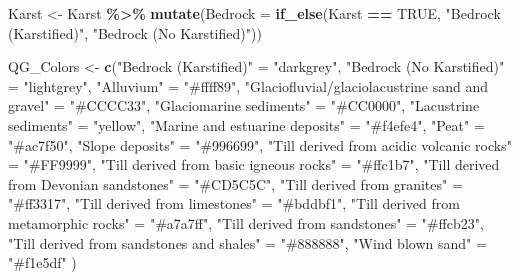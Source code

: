 \documentclass[
  12pt,
]{article}
\newenvironment{Shaded}{\begin{snugshade}}{\end{snugshade}}
\newcommand{\DataTypeTok}[1]{\textcolor[rgb]{0.13,0.29,0.53}{#1}}
\newcommand{\KeywordTok}[1]{\textcolor[rgb]{0.13,0.29,0.53}{\textbf{#1}}}
\newcommand{\NormalTok}[1]{#1}
\newcommand{\OperatorTok}[1]{\textcolor[rgb]{0.81,0.36,0.00}{\textbf{#1}}}
\newcommand{\OtherTok}[1]{\textcolor[rgb]{0.56,0.35,0.01}{#1}}
\newcommand{\StringTok}[1]{\textcolor[rgb]{0.31,0.60,0.02}{#1}}
\begin{document}
\begin{Shaded}
\begin{Highlighting}[]
\NormalTok{  Karst \textless{}{-}}\StringTok{ }\NormalTok{Karst }\OperatorTok{\%\textgreater{}\%}\StringTok{ }\KeywordTok{mutate}\NormalTok{(}\DataTypeTok{Bedrock =} \KeywordTok{if\_else}\NormalTok{(Karst }\OperatorTok{==}\StringTok{ }\OtherTok{TRUE}\NormalTok{,}
                                              \StringTok{"Bedrock (Karstified)"}\NormalTok{,}
                                              \StringTok{"Bedrock (No Karstified)"}\NormalTok{))}
  
\NormalTok{  QG\_Colors \textless{}{-}}\StringTok{ }\KeywordTok{c}\NormalTok{(}\StringTok{"Bedrock (Karstified)"}\NormalTok{    =}\StringTok{ "darkgrey"}\NormalTok{,}
                 \StringTok{"Bedrock (No Karstified)"}\NormalTok{ =}\StringTok{ "lightgrey"}\NormalTok{,}
                 \StringTok{"Alluvium"}\NormalTok{ =}\StringTok{ "\#ffff89"}\NormalTok{,}
                 \StringTok{"Glaciofluvial/glaciolacustrine sand and gravel"}\NormalTok{ =}\StringTok{ "\#CCCC33"}\NormalTok{,}
                 \StringTok{"Glaciomarine sediments"}\NormalTok{ =}\StringTok{ "\#CC0000"}\NormalTok{,}
                 \StringTok{"Lacustrine sediments"}\NormalTok{ =}\StringTok{ "yellow"}\NormalTok{,}
                 \StringTok{"Marine and estuarine deposits"}\NormalTok{ =}\StringTok{ "\#f4efe4"}\NormalTok{,}
                 \StringTok{"Peat"}\NormalTok{ =}\StringTok{ "\#ac7f50"}\NormalTok{,}
                 \StringTok{"Slope deposits"}\NormalTok{ =}\StringTok{ "\#996699"}\NormalTok{,}
                 \StringTok{"Till derived from acidic volcanic rocks"}\NormalTok{ =}\StringTok{ "\#FF9999"}\NormalTok{,}
                 \StringTok{"Till derived from basic igneous rocks"}\NormalTok{ =}\StringTok{ "\#ffc1b7"}\NormalTok{,}
                 \StringTok{"Till derived from Devonian sandstones"}\NormalTok{ =}\StringTok{ "\#CD5C5C"}\NormalTok{,}
                 \StringTok{"Till derived from granites"}\NormalTok{ =}\StringTok{ "\#ff3317"}\NormalTok{,}
                 \StringTok{"Till derived from limestones"}\NormalTok{ =}\StringTok{ "\#bddbf1"}\NormalTok{,}
                 \StringTok{"Till derived from metamorphic rocks"}\NormalTok{ =}\StringTok{ "\#a7a7ff"}\NormalTok{,}
                 \StringTok{"Till derived from sandstones"}\NormalTok{ =}\StringTok{ "\#ffcb23"}\NormalTok{,}
                 \StringTok{"Till derived from sandstones and shales"}\NormalTok{ =}\StringTok{ "\#888888"}\NormalTok{,}
                 \StringTok{"Wind blown sand"}\NormalTok{ =}\StringTok{ "\#f1e5df"} 
\NormalTok{  )}
                  

\end{Highlighting}
\end{Shaded}
\end{document}
